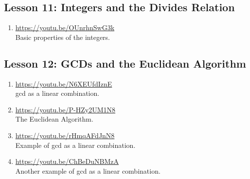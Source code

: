 \documentclass[11pt]{amsart}
\begin{document}
\subsection{Lesson 11: Integers and the Divides Relation }

\begin{enumerate}

\item \url{https://youtu.be/OUnrhnSwG3k}\\
Basic properties of the integers.\\[5pt]


\end{enumerate}

\subsection{Lesson 12: GCDs and the Euclidean Algorithm}

\begin{enumerate}

\item \url{https://youtu.be/N6XEUfdIznE}\\
gcd as a linear combination.\\[5pt]



\item \url{https://youtu.be/P-HZy2UM1N8}\\
The Euclidean Algorithm.\\[5pt]



\item \url{https://youtu.be/rHmqAFdJnN8}\\
Example of gcd as a linear combination.\\[5pt]



\item \url{https://youtu.be/ChBeDuNBMzA}\\
Another example of gcd as a linear combination.\\[5pt]


\end{enumerate}
\end{document}
